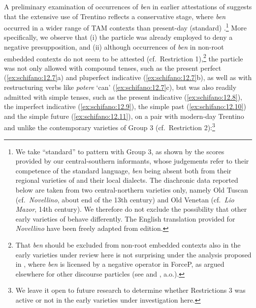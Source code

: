 \documentclass[output=paper]{langsci/langscibook}
\begin{document}
A preliminary examination of occurrences of \emph{ben} in earlier attestations
of  suggests that the extensive use of Trentino reflects a
conservative stage, where \emph{ben} occurred in a wider range of \gls{TAM}
contexts than present-day (standard) .\footnote{We take
    \enquote{standard}  to pattern with Group 3, as shown by the scores
    provided by our central-southern informants, whose judgements refer to
    their competence of the standard language, \emph{ben} being absent both
    from their regional varieties of  and their local  dialects.
    The diachronic data reported below are taken from two central-northern
    varieties only, namely Old Tuscan (cf.\ \emph{Novellino}, about end of the
    13th
    century) and Old Venetan (cf.\ \emph{Lio Mazor}, 14th century). We therefore
    do not exclude the possibility that other early varieties of 
    behave differently.  The English translation provided for \emph{Novellino}
    have been freely adapted from  edition.} More
    specifically, we observe that (i) the particle was already employed to deny
    a negative presupposition, and (ii) although occurrences of \emph{ben} in
    non-root embedded contexts do not seem to be attested (cf.\ Restriction
    1),\footnote{That \emph{ben} should be excluded from non-root embedded
        contexts also in the early varieties under review here is not
        surprising under the analysis proposed in \textcite{CognSchi2018b},
    where \emph{ben} is licensed by a negative operator in ForceP, as argued
elsewhere for other discourse particles (see \citealt{Coniglio2008} and
\citealt{Zimmermann2004,Zimmermann2011}, a.o.).} the particle was not only
allowed with compound tenses, such as the present perfect (\ref{ex:schifano:12.7}a) and pluperfect
indicative (\ref{ex:schifano:12.7}b), as well as with restructuring verbs like \emph{potere} ‘can’
(\ref{ex:schifano:12.7}c), but was also readily admitted with simple tenses, such as the present
indicative (\ref{ex:schifano:12.8}), the imperfect indicative (\ref{ex:schifano:12.9}), the simple past (\ref{ex:schifano:12.10}) and the
simple future (\ref{ex:schifano:12.11}), on a pair with modern-day Trentino and unlike the
contemporary  varieties of Group 3 (cf.\ Restriction 2):\footnote{We
leave it open to future research to determine whether Restrictions 3 was active
or not in the early varieties under investigation here.}
\end{document}
